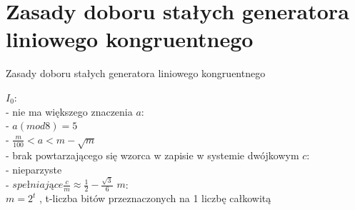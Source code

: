 \section{Zasady doboru stałych generatora liniowego kongruentnego}
	\begin{frame}{Zasady doboru stałych generatora liniowego kongruentnego}

 	 $I_{0}$: \\
 	 - nie ma większego znaczenia
	\newline \newline
	$a$: \\
	- $a(mod 8)=5$ \\
	- $\frac{m}{100}<a<m-\sqrt{m}$ \\
	- brak powtarzającego się wzorca w zapisie w systemie dwójkowym
	\newline \newline
	$c$: \\
	- nieparzyste \\
 	- $spełniające \frac{c}{m}\approx\frac{1}{2}-\frac{\sqrt{3}}{6}$
	\newline \newline
	$m$: \\
	$m=2^{t}$ , \quad t-liczba bitów przeznaczonych na 1 liczbę całkowitą


	\end{frame}
